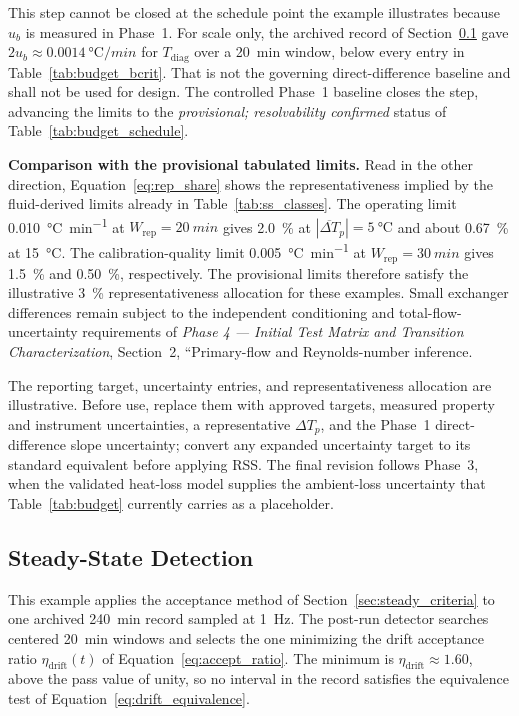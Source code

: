 \documentclass[11pt]{article}
\newcommand{\Tdiag}{T_{\mathrm{diag}}}
\newcommand{\PhaseFourDoc}{\textit{Phase 4 --- Initial Test Matrix and Transition Characterization}}
\begin{document}
This step cannot be closed at the schedule point the example illustrates because $u_b$ is measured in Phase~1. For scale only, the archived record of Section~\ref{sec:ss_example} gave $2u_b\approx\SI{0.0014}{\degreeCelsius\per min}$ for $\Tdiag$ over a \SI{20}{min} window, below every entry in Table~\ref{tab:budget_bcrit}. That is not the governing direct-difference baseline and shall not be used for design. The controlled Phase~1 baseline closes the step, advancing the limits to the \emph{provisional; resolvability confirmed} status of Table~\ref{tab:budget_schedule}.

\textbf{Comparison with the provisional tabulated limits.} Read in the other direction, Equation~\eqref{eq:rep_share} shows the representativeness implied by the fluid-derived limits already in Table~\ref{tab:ss_classes}. The operating limit \SI{0.010}{\degreeCelsius\per min} at $W_{\mathrm{rep}}=\SI{20}{min}$ gives \SI{2.0}{\percent} at $|\overline{\Delta T}_p|=\SI{5}{\degreeCelsius}$ and about \SI{0.67}{\percent} at \SI{15}{\degreeCelsius}. The calibration-quality limit \SI{0.005}{\degreeCelsius\per min} at $W_{\mathrm{rep}}=\SI{30}{min}$ gives \SI{1.5}{\percent} and \SI{0.50}{\percent}, respectively. The provisional limits therefore satisfy the illustrative \SI{3}{\percent} representativeness allocation for these examples. Small exchanger differences remain subject to the independent conditioning and total-flow-uncertainty requirements of \PhaseFourDoc, Section~2, ``Primary-flow and Reynolds-number inference.

The reporting target, uncertainty entries, and representativeness allocation are illustrative. Before use, replace them with approved targets, measured property and instrument uncertainties, a representative $\Delta T_p$, and the Phase~1 direct-difference slope uncertainty; convert any expanded uncertainty target to its standard equivalent before applying RSS. The final revision follows Phase~3, when the validated heat-loss model supplies the ambient-loss uncertainty that Table~\ref{tab:budget} currently carries as a placeholder.

\subsection{Steady-State Detection}
\label{sec:ss_example}

This example applies the acceptance method of
Section~\ref{sec:steady_criteria} to one archived \SI{240}{min} record sampled
at \SI{1}{Hz}. The post-run detector searches centered \SI{20}{min} windows and
selects the one minimizing the drift acceptance ratio
$\eta_{\mathrm{drift}}(t)$ of Equation~\eqref{eq:accept_ratio}. The minimum is
$\eta_{\mathrm{drift}}\approx\num{1.60}$, above the pass value of unity, so no
interval in the record satisfies the equivalence test of
Equation~\eqref{eq:drift_equivalence}.
\end{document}
